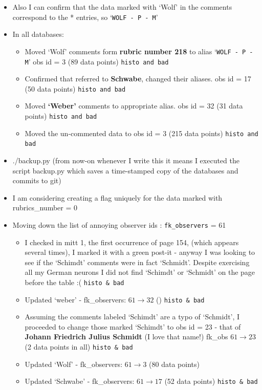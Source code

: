 \documentclass[12pt]{article}
\begin{document}
\begin{itemize}
    \item Also I can confirm that the data marked with `Wolf' in the comments correspond to the * entries, so `\texttt{WOLF - P - M}'
    \item In all databases:
    \begin{itemize}
        \item Moved `Wolf' comments form \textbf{rubric number 218} to alias `\texttt{WOLF - P - M}' obs id = 3 (89 data points) \texttt{histo and bad}
        \item Confirmed that \dag{} referred to \textbf{Schwabe}, changed their aliases. obs id = 17 (50 data points) \texttt{histo and bad}
        \item Moved \textbf{`Weber'} comments to appropriate alias. obs id = 32 (31 data points) \texttt{histo and bad}
        \item Moved the un-commented data to obs id = 3 (215 data points) \texttt{histo and bad}
    \end{itemize}
    \item ./backup.py (from now-on whenever I write this it means I executed the script backup.py which saves a time-stamped copy of the databases and commits to git)
    \item I am considering creating a flag uniquely for the data marked with rubrics\_number = 0
    \item Moving down the list of annoying observer ids : \texttt{fk\_observers} = 61
    \begin{itemize}
        \item I checked in mitt 1, the first occurrence of page 154, (which appears several times), I marked it with a green post-it - anyway I was looking to see if the `Schimdt' comments were in fact `Schmidt'. Despite exercising all my German neurons I did not find `Schimdt' or `Schmidt' on the page before the table :( \texttt{histo \& bad}
        \item Updated `weber' - fk\_observers: $61\to 32$ () \texttt{histo \& bad}
        \item Assuming the comments labeled `Schimdt' are a typo of `Schmidt', I proceeded to change those marked `Schimdt' to obs id = 23 - that of \textbf{Johann Friedrich  Julius Schmidt} (I love that name!) fk\_obs $61\to 23$ (2 data points in all) \texttt{histo & bad}
        \item Updated `Wolf' - fk\_observers: $61\to 3$ (80 data points) 
        \item Updated `Schwabe' - fk\_observers: $61\to 17$ (52 data points) \texttt{histo \& bad}

\end{itemize}
\end{itemize}
\end{document}
